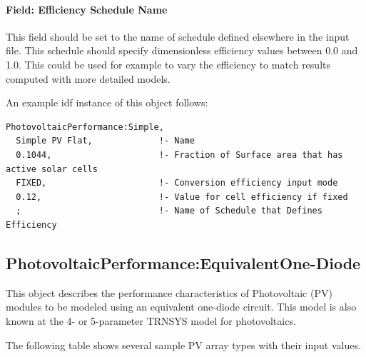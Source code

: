 \paragraph{Field: Efficiency Schedule Name}\label{field-efficiency-schedule-name}

This field should be set to the name of schedule defined elsewhere in the input file. This schedule should specify dimensionless efficiency values between 0.0 and 1.0. This could be used for example to vary the efficiency to match results computed with more detailed models.

An example idf instance of this object follows:

\begin{lstlisting}
PhotovoltaicPerformance:Simple,
  Simple PV Flat,             !- Name
  0.1044,                     !- Fraction of Surface area that has active solar cells
  FIXED,                      !- Conversion efficiency input mode
  0.12,                       !- Value for cell efficiency if fixed
  ;                           !- Name of Schedule that Defines Efficiency
\end{lstlisting}

\subsection{PhotovoltaicPerformance:EquivalentOne-Diode}\label{photovoltaicperformanceequivalentone-diode}

This object describes the performance characteristics of Photovoltaic (PV) modules to be modeled using an equivalent one-diode circuit. This model is also known at the 4- or 5-parameter TRNSYS model for photovoltaics.

The following table shows several sample PV array types with their input values.

